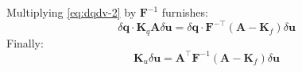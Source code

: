 Multiplying \eqref{eq:dqdv-2} by \(\bm{F}^{-1}\) furnishes:
\begin{equation*}
\delta \bm{q} \cdot \mathbf{K}_q \mathbf{A} \delta \bm{u}
=
\delta \bm{q} \cdot \bm{F}^{-\top} \left(\mathbf{A} - \mathbf{K}_f\right) \delta \bm{u}
\end{equation*}
Finally:
\begin{equation}
\mathbf{K}_u\delta\bm{u} = \mathbf{A}^{\top}\bm{F}^{-1}\left( 
\mathbf{A} - \mathbf{K}_f
\right)\delta \bm{u}
\label{eq:mf-tangent}
\end{equation}

